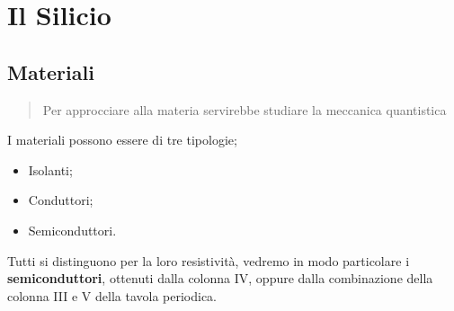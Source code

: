 \chapter{Il Silicio}

\section{Materiali}
\begin{quote}
    Per approcciare alla materia servirebbe studiare la meccanica quantistica
\end{quote}

I materiali possono essere di tre tipologie;
\begin{itemize}
    \item Isolanti;
    \item Conduttori;
    \item Semiconduttori.
\end{itemize}

Tutti si distinguono per la loro resistività, vedremo in modo particolare i \textbf{semiconduttori}, ottenuti dalla colonna IV, oppure dalla combinazione della colonna III e V della tavola periodica.



